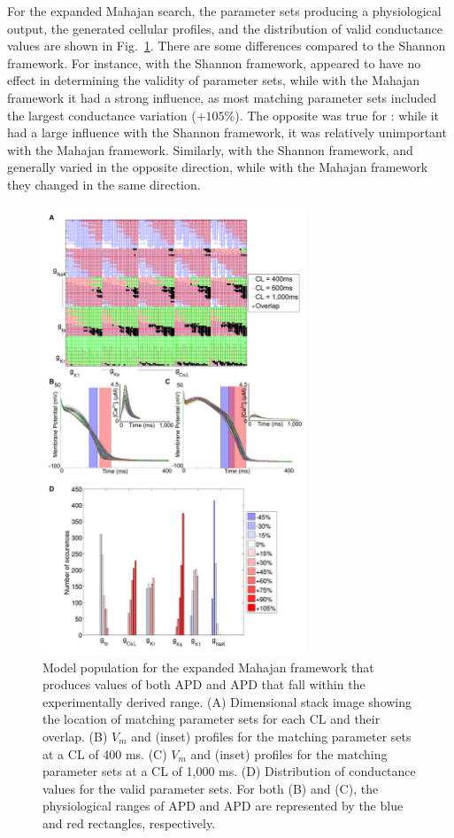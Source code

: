 \documentclass[../thesis-main.tex]{subfiles}
\begin{document}
For the expanded Mahajan search, the parameter sets producing a physiological output, the generated cellular profiles, and the distribution of valid conductance values are shown in Fig.~\ref{fig:mahajan-population}. There are some differences compared to the Shannon framework. For instance, with the Shannon framework, \gks{} appeared to have no effect in determining the validity of parameter sets, while with the Mahajan framework it had a strong influence, as most matching parameter sets included the largest conductance variation ($+105\%$). The opposite was true for \gkix{}: while it had a large influence with the Shannon framework, it was relatively unimportant with the Mahajan framework. Similarly, with the Shannon framework, \gto{} and \gnak{} generally varied in the opposite direction, while with the Mahajan framework they changed in the same direction.
\begin{figure}
 \centering
 \includegraphics[width=0.7\textwidth]{mahajan-population}
 \caption[Model population for the expanded Mahajan framework that produces values of both APD and APD that fall within the experimentally derived range.]{Model population for the expanded Mahajan framework that produces values of both APD and APD that fall within the experimentally derived range. (A) Dimensional stack image showing the location of matching parameter sets for each CL and their overlap. (B) $V_m$ and \cai{} (inset) profiles for the matching parameter sets at a CL of 400 ms. (C) $V_m$ and \cai{} (inset) profiles for the matching parameter sets at a CL of 1,000 ms. (D) Distribution of conductance values for the valid parameter sets. For both (B) and (C), the physiological ranges of APD and APD are represented by the blue and red rectangles, respectively.}
 \label{fig:mahajan-population}
\end{figure}
\end{document}
